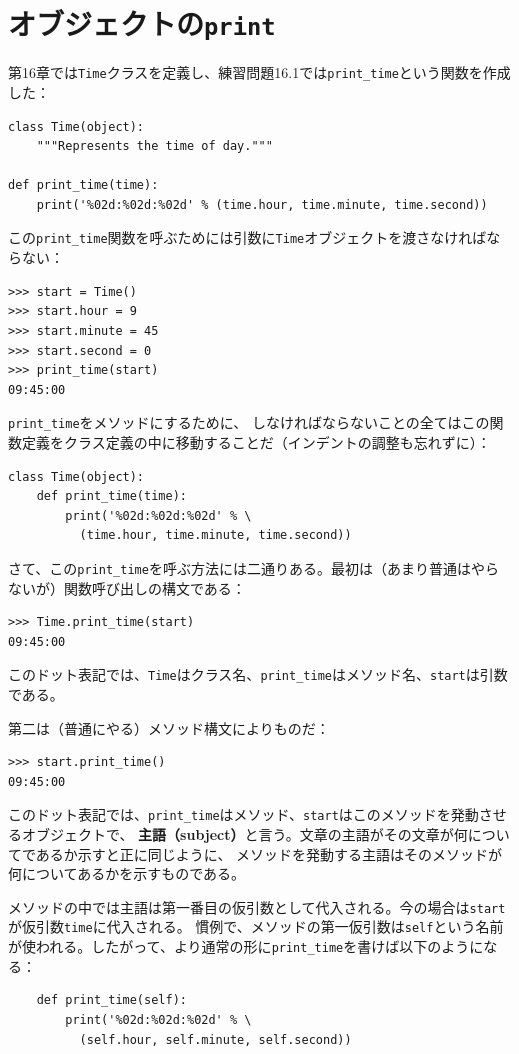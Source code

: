 \documentclass[a4j,12pt,makeidx]{jbook}
\begin{document}
\section{オブジェクトの{\tt print}}
第16章では{\tt Time}クラスを定義し、練習問題16.1では{\tt print\_time}という関数を作成した：
\begin{verbatim}
class Time(object):
    """Represents the time of day."""

def print_time(time):
    print('%02d:%02d:%02d' % (time.hour, time.minute, time.second))
\end{verbatim}
この{\tt print\_time}関数を呼ぶためには引数に{\tt Time}オブジェクトを渡さなければならない：
\begin{verbatim}
>>> start = Time()
>>> start.hour = 9
>>> start.minute = 45
>>> start.second = 0
>>> print_time(start)
09:45:00
\end{verbatim} 
{\tt print\_time}をメソッドにするために、
しなければならないことの全てはこの関数定義をクラス定義の中に移動することだ（インデントの調整も忘れずに）：
\begin{verbatim}
class Time(object):
    def print_time(time):
        print('%02d:%02d:%02d' % \
          (time.hour, time.minute, time.second))
\end{verbatim} \par
さて、この{\tt print\_time}を呼ぶ方法には二通りある。最初は（あまり普通はやらないが）関数呼び出しの構文である：
\begin{verbatim}
>>> Time.print_time(start)
09:45:00
\end{verbatim}
このドット表記では、{\tt Time}はクラス名、{\tt print\_time}はメソッド名、{\tt start}は引数である。\par
第二は（普通にやる）メソッド構文によりものだ：
\begin{verbatim}
>>> start.print_time()
09:45:00
\end{verbatim}
このドット表記では、{\tt print\_time}はメソッド、{\tt start}はこのメソッドを発動させるオブジェクトで、
{\bf 主語（subject）}と言う。文章の主語がその文章が何についてであるか示すと正に同じように、
メソッドを発動する主語はそのメソッドが何についてあるかを示すものである。\par
メソッドの中では主語は第一番目の仮引数として代入される。今の場合は{\tt start}が仮引数{\tt time}に代入される。
慣例で、メソッドの第一仮引数は{\tt self}という名前が使われる。したがって、より通常の形に{\tt print\_time}を書けば以下のようになる：
\begin{verbatim}
    def print_time(self):
        print('%02d:%02d:%02d' % \
          (self.hour, self.minute, self.second))
\end{verbatim}
\end{document}
